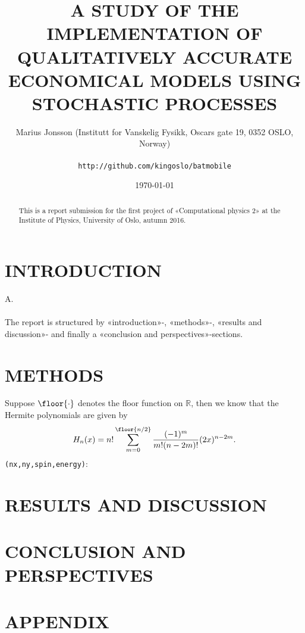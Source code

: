\documentclass[11pt,english,a4paper]{article}
\author{\normalsize Marius Jonsson (Institutt for Vanskelig Fysikk, Oscars gate 19, 0352 OSLO, Norway) \\\\
\vspace{5px}
\normalsize \texttt{http://github.com/kingoslo/batmobile}}
\title{\bf \uppercase{A study of the implementation of qualitatively accurate economical models using stochastic processes}}
\date{\normalsize \today}
\begin{document}
\maketitle
\begin{abstract} \normalsize This is a report submission for the first project of «Computational physics 2» at the Institute of Physics, University of Oslo, autumn 2016.
\end{abstract}
\lstset{
  xleftmargin=.2\textwidth, xrightmargin=.2\textwidth
}

\section*{\uppercase{Introduction}}
A.\\
\\
The report is structured by «introduction»-, «methods»-, «results and discussion»- and finally a «conclusion and perspectives»-sections.
\section*{\uppercase{Methods}}
Suppose $\floor{\cdot}$ denotes the floor function on $\mathbb{R}$, then we know that the Hermite polynomials are given by
\[
H_n(x) = n! \sum_{m=0}^{\floor{n/2}} \frac{(-1)^m}{m!(n-2m)!}(2x)^{n-2m}.
\]
\texttt{(nx,ny,spin,energy)}:
%
\section*{\uppercase{Results and discussion}}

\section*{\uppercase{Conclusion and perspectives}}

\section*{\uppercase{Appendix}}


\printbibliography
\end{document}
